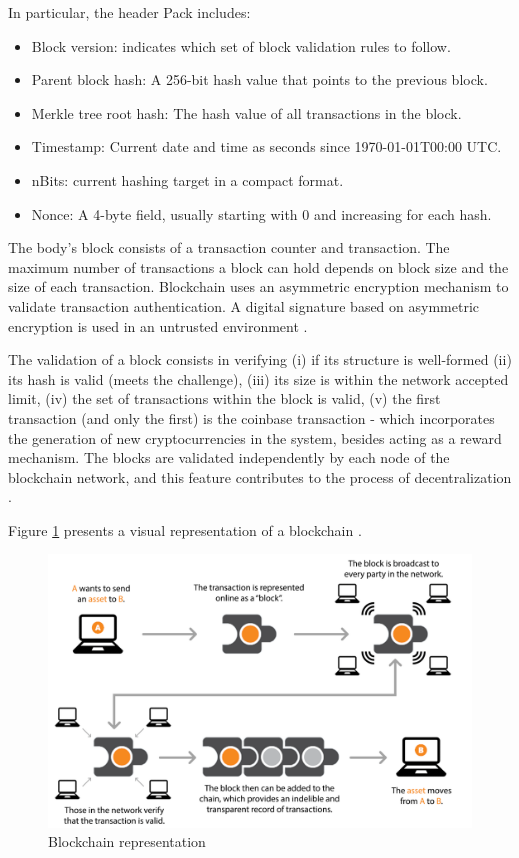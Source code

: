 In particular, the header Pack includes:

\begin{itemize}
\item Block version: indicates which set of block validation rules to follow.
\item Parent block hash: A 256-bit hash value that points to the previous block.
\item Merkle tree root hash: The hash value of all transactions in the block.
\item Timestamp: Current date and time as seconds since 1970-01-01T00:00 UTC.
\item  nBits: current hashing target in a compact format.
\item Nonce: A 4-byte field, usually starting with 0 and increasing for each hash.
\end{itemize}

The body's block consists of a transaction counter and transaction. The maximum number of transactions a block can hold depends on block size and the size of each transaction. Blockchain uses an asymmetric encryption mechanism to validate transaction authentication. A digital signature based on asymmetric encryption is used in an untrusted environment \cite{zheng2016blockchain}.

The validation of a block consists in verifying (i) if its structure is well-formed (ii) its hash is valid (meets the challenge), (iii) its size is within the network accepted limit, (iv) the set of transactions within the block is valid, (v) the first transaction (and only the first) is the coinbase transaction - which incorporates the generation of new cryptocurrencies in the system, besides acting as a reward mechanism. The blocks are validated independently by each node of the blockchain network, and this feature contributes to the process of decentralization \cite{greve2018blockchain}.

Figure \ref{fig:blockchain} presents a visual representation of a blockchain \cite{tian2017supply}.

\begin{figure}[htbp]
\begin{center}
  \includegraphics[scale=0.35]{images/blockchain.png}
\caption{Blockchain representation \cite{michael2018blockchain}}
\label{fig:blockchain}
\end{center}
\end{figure}

